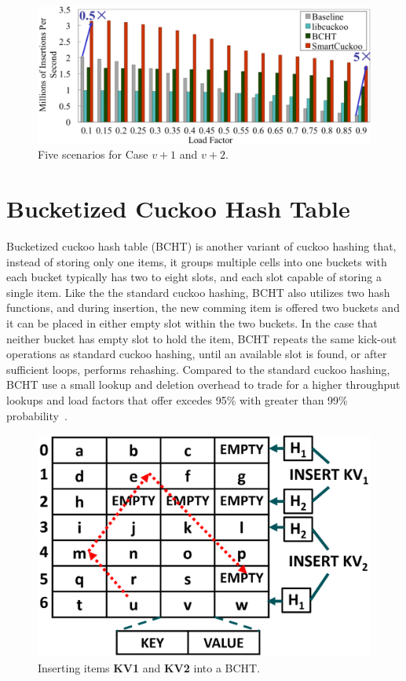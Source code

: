 \documentclass[12pt,conference,compsoc]{IEEEtran}
\begin{document}
\begin{figure}
    \centering
    \includegraphics[width=\linewidth]{performance.png}
    \caption{Five scenarios for Case $v+1$ and $v+2$.} \label{fig:performance}
\end{figure}

\section{Bucketized Cuckoo Hash Table}
\label{sec:BCHT}
Bucketized cuckoo hash table (BCHT) is another variant of cuckoo hashing that, instead of storing only one items, it groups multiple cells into one buckets with each bucket typically has two to eight slots, and each slot capable of storing a single item. Like the the standard cuckoo hashing, BCHT also utilizes two hash functions, and during insertion, the new comming item is offered two buckets and it can be placed in either empty slot within the two buckets. In the case that neither bucket has empty slot to hold the item, BCHT repeats the same kick-out operations as standard cuckoo hashing, until an available slot is found, or after sufficient loops, performs rehashing. Compared to the standard cuckoo hashing, BCHT use a small lookup and deletion overhead to trade for a  higher throughput lookups and load factors that offer excedes 95\% with greater than 99\% probability~\cite{coolCuckoo}.

\begin{figure}
    \centering
    \includegraphics[width=\linewidth]{BCHT.png}
    \caption{Inserting items \textbf{KV1} and \textbf{KV2} into a BCHT.} \label{fig:BCHT}
\end{figure}
\end{document}
